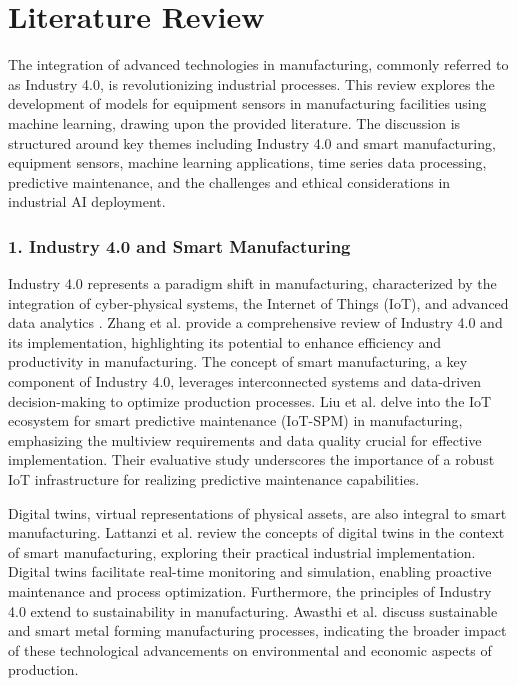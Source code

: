 \chapter{Literature Review}
\label{chap:literature}
\setlength{\parskip}{1em}

The integration of advanced technologies in manufacturing, commonly referred to as Industry 4.0, is revolutionizing industrial processes. This review explores the development of models for equipment sensors in manufacturing facilities using machine learning, drawing upon the provided literature. The discussion is structured around key themes including Industry 4.0 and smart manufacturing, equipment sensors, machine learning applications, time series data processing, predictive maintenance, and the challenges and ethical considerations in industrial AI deployment.

\subsection*{1. Industry 4.0 and Smart Manufacturing}

Industry 4.0 represents a paradigm shift in manufacturing, characterized by the integration of cyber-physical systems, the Internet of Things (IoT), and advanced data analytics \cite{zhang-2021}. Zhang et al. \cite{zhang-2021} provide a comprehensive review of Industry 4.0 and its implementation, highlighting its potential to enhance efficiency and productivity in manufacturing.  The concept of smart manufacturing, a key component of Industry 4.0, leverages interconnected systems and data-driven decision-making to optimize production processes. Liu et al. \cite{liu-2023} delve into the IoT ecosystem for smart predictive maintenance (IoT-SPM) in manufacturing, emphasizing the multiview requirements and data quality crucial for effective implementation. Their evaluative study underscores the importance of a robust IoT infrastructure for realizing predictive maintenance capabilities.

Digital twins, virtual representations of physical assets, are also integral to smart manufacturing. Lattanzi et al. \cite{lattanzi-2021} review the concepts of digital twins in the context of smart manufacturing, exploring their practical industrial implementation. Digital twins facilitate real-time monitoring and simulation, enabling proactive maintenance and process optimization. Furthermore, the principles of Industry 4.0 extend to sustainability in manufacturing. Awasthi et al. \cite{awasthi-2021} discuss sustainable and smart metal forming manufacturing processes, indicating the broader impact of these technological advancements on environmental and economic aspects of production.

